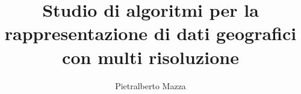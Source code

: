 \documentclass[a4paper,12pt,oneside]{report}
\begin{document}
  
	\title{Studio di algoritmi per la rappresentazione di dati geografici con multi risoluzione}
	\author{Pietralberto Mazza}

	\maketitle
	\salvastmpB
	
	\clearpage{\pagestyle{empty}\cleardoublepage}
	\tableofcontents
	\salvastmpB	
	\newpage	
	\listoffigures		
	\newpage	
	
	
	
	
	
	
	
\end{document}
